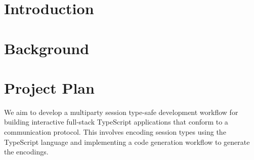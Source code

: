 \documentclass[12pt,twoside]{report}
\begin{document}



\tableofcontents


\chapter{Introduction}






\chapter{Background}

 


\clearpage


\clearpage



\chapter{Project Plan}
We aim to develop a multiparty session type-safe development workflow for building interactive full-stack TypeScript applications that conform to a communication protocol. This involves encoding session types using the TypeScript language and implementing a code generation workflow to generate the encodings.
\end{document}
